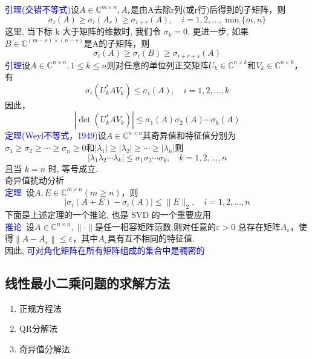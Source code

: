 \documentclass[12pt,a4paper]{article}
\begin{document}
\textcolor{blue}{引理(交错不等式)}设$A \in \mathbb{C}^{m \times n}, A_{r}$是由A去除r列(或r行)后得到的子矩阵，则
$$
\sigma_{i}(A) \geq \sigma_{i}\left(A_{r}\right) \geq \sigma_{i+r}(A), \quad i=1,2, \ldots, \min \{m, n\}
$$
这里, 当下标 k 大于矩阵的维数时, 我们令 $\sigma_{k} = 0$.
更进一步, 如果$B \in \mathbb{C}^{(m-r) \times(n-s)}$是A的子矩阵，则
$$
\sigma_{i}(A) \geq \sigma_{i}(B) \geq \sigma_{i+r+s}(A)
$$
\textcolor{blue}{引理}设$A \in \mathbb{C}^{n \times n}, 1 \leq k \leq n$则对任意的单位列正交矩阵$U_{k} \in \mathbb{C}^{n \times k}$和$V_{k} \in \mathbb{C}^{n \times k}$，有
\begin{equation}
\sigma_{i}\left(U_{k}^{*} A V_{k}\right) \leq \sigma_{i}(A), \quad i=1,2, \ldots, k
\end{equation}
因此，
\begin{equation}
\left|\operatorname{det}\left(U_{k}^{*} A V_{k}\right)\right| \leq \sigma_{1}(A) \sigma_{2}(A) \cdots \sigma_{k}(A)
\end{equation}
\textcolor{blue}{定理(Weyl不等式，1949)}设$A \in \mathbb{C}^{n \times n}$其奇异值和特征值分别为$\sigma_{1} \geq \sigma_{2} \geq \cdots \geq \sigma_{n} \geq 0$和$\left|\lambda_{1}\right| \geq\left|\lambda_{2}\right| \geq \cdots \geq\left|\lambda_{n}\right|$则
$$
\left|\lambda_{1} \lambda_{2} \cdots \lambda_{k}\right| \leq \sigma_{1} \sigma_{2} \cdots \sigma_{k}, \quad k=1,2, \ldots, n
$$
且当 $k = n$ 时, 等号成立.\\

奇异值扰动分析\\

\textcolor{blue}{定理}~设$A, E \in \mathbb{C}^{m \times n}(m \geq n)$，则
$$
\left|\sigma_{i}(A+E)-\sigma_{i}(A)\right| \leq\|E\|_{2}, \quad i=1,2, \ldots, n
$$
下面是上述定理的一个推论, 也是 SVD 的一个重要应用\\

\textcolor{blue}{推论}~设$A \in \mathbb{C}^{n \times n},\|\cdot\|$是任一相容矩阵范数,则对任意的$\varepsilon>0$
总存在矩阵$A_{\varepsilon}$，使得$\left\|A-A_{\varepsilon}\right\| \leq \varepsilon$，其中$A_{\varepsilon}$具有互不相同的特征值.\\
因此, \textcolor{blue}{可对角化矩阵在所有矩阵组成的集合中是稠密的}
\subsection{线性最小二乘问题的求解方法}
\begin{enumerate}[5.1]
	\item 正规方程法
	\item QR分解法
	\item 奇异值分解法
\end{enumerate}
\end{document}
